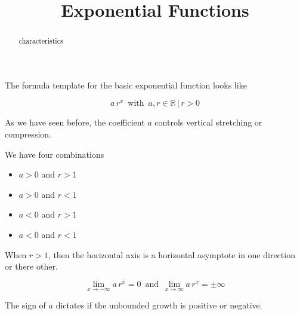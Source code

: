 \documentclass{ximera}
\title{Exponential Functions}
\begin{document}
\begin{abstract}
characteristics
\end{abstract}
\maketitle




The formula template for the basic exponential function looks like




\[  a \, r^x   \, \text{ with } \,  a, r \in \mathbb{R} \, | \,  r > 0   \]


As we have seen before, the coefficient $a$ controls vertical stretching or compression.




We have four combinations

\begin{itemize}
\item $a>0$ and $r>1$
\item $a>0$ and $r<1$
\item $a<0$ and $r>1$
\item $a<0$ and $r<1$
\end{itemize}


When $r>1$, then the horizontal axis is a horizontal asymptote in one direction or there other.



\[  \lim_{x \to -\infty} a \, r^x = 0 \, \text{ and } \, \lim_{x \to \infty} a \, r^x = \pm\infty \]


The sign of $a$ dictates if the unbounded growth is positive or negative.
\end{document}
